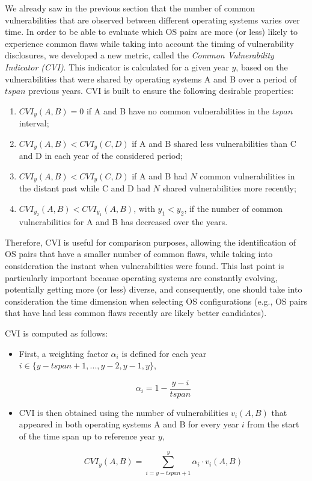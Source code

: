 We already saw in the previous section that the number of common vulnerabilities that are observed between different operating systems varies over time. In order to be able to evaluate which OS pairs are more (or less) likely to experience common flaws while taking into account the timing of vulnerability disclosures, we developed a new metric, called the \emph{Common Vulnerability Indicator (CVI)}. This indicator is calculated for a given year $y$, based on the vulnerabilities that were shared by operating systems A and B over a period of $\mathit{tspan}$ previous years. CVI is built to ensure the following desirable properties:
\begin{enumerate}
\newcommand{\OLDtheenumi}{\theenumi}
\renewcommand{\theenumi}{\roman{enumi}}
\item $\mathit{CVI}_y(A,B) = 0$ if A and B have no common vulnerabilities in the $\mathit{tspan}$ interval;
\item $\mathit{CVI}_y(A,B) < \mathit{CVI}_y(C,D)$ if A and B shared less vulnerabilities than C and D in each year of the considered period;
\item $\mathit{CVI}_y(A,B) < \mathit{CVI}_y(C,D)$ if A and B had $N$ common vulnerabilities in the distant past while C and D had $N$ shared vulnerabilities more recently;
\item $\mathit{CVI}_{y_2}(A,B) < \mathit{CVI}_{y_1}(A,B)$, with $y_1 < y_2$, if the number of common vulnerabilities for A and B has decreased over the years.
\renewcommand{\theenumi}{\OLDtheenumi}
\end{enumerate}
Therefore, CVI is useful for comparison purposes, allowing the identification of OS pairs that have a smaller number of common flaws, while taking into consideration the instant when vulnerabilities were found. This last point is particularly important because operating systems are constantly evolving, potentially getting more (or less) diverse, and consequently, one should take into consideration the time dimension when selecting OS configurations (e.g., OS pairs that have had less common flaws recently are likely better candidates).

CVI is computed as follows:

\begin{itemize}

\item First, a weighting factor $\alpha_{i}$ is defined for each year   $i \in \{y-\mathit{tspan}+1, ..., y-2, y-1, y\}$,

\begin{equation}
\alpha_{i} = 1 - \frac{y-i}{\mathit{tspan}}
\end{equation}

\item CVI is then obtained using the number of vulnerabilities $v_{i}(A,B)$ that appeared in both operating systems A and B for every year $i$ from the start of the time span up to reference year $y$,

\begin{equation}
\mathit{CVI}_{y}(A,B)= \sum_{i = y-\mathit{tspan}+1}^{y} \alpha_{i}\cdot v_{i}(A,B)
\end{equation}

\end{itemize}


